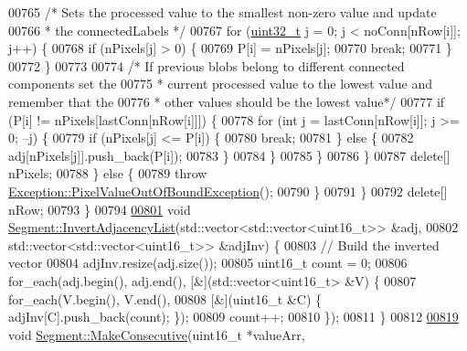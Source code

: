 \begin{DoxyCode}
00765         \textcolor{comment}{/* Sets the processed value to the smallest non-zero value and update}
00766 \textcolor{comment}{         * the connectedLabels */}
00767         \textcolor{keywordflow}{for} (\hyperlink{_soil_math_types_8h_a435d1572bf3f880d55459d9805097f62}{uint32\_t} j = 0; j < noConn[nRow[i]]; j++) \{
00768           \textcolor{keywordflow}{if} (nPixels[j] > 0) \{
00769             P[i] = nPixels[j];
00770             \textcolor{keywordflow}{break};
00771           \}
00772         \}
00773 
00774         \textcolor{comment}{/* If previous blobs belong to different connected components set the}
00775 \textcolor{comment}{         * current processed value to the lowest value and remember that the}
00776 \textcolor{comment}{         * other values should be the lowest value*/}
00777         \textcolor{keywordflow}{if} (P[i] != nPixels[lastConn[nRow[i]]]) \{
00778           \textcolor{keywordflow}{for} (\textcolor{keywordtype}{int} j = lastConn[nRow[i]]; j >= 0; --j) \{
00779             \textcolor{keywordflow}{if} (nPixels[j] <= P[i]) \{
00780               \textcolor{keywordflow}{break};
00781             \} \textcolor{keywordflow}{else} \{
00782               adj[nPixels[j]].push\_back(P[i]);
00783             \}
00784           \}
00785         \}
00786       \}
00787       \textcolor{keyword}{delete}[] nPixels;
00788     \} \textcolor{keywordflow}{else} \{
00789       \textcolor{keywordflow}{throw} \hyperlink{class_vision_1_1_exception_1_1_pixel_value_out_of_bound_exception}{Exception::PixelValueOutOfBoundException}();
00790     \}
00791   \}
00792   \textcolor{keyword}{delete}[] nRow;
00793 \}
00794 
\hypertarget{_segment_8cpp_source_l00801}{}\hyperlink{class_vision_1_1_segment_aac70975917e231c4879ff4f837ac9f73}{00801} \textcolor{keywordtype}{void} \hyperlink{class_vision_1_1_segment_aac70975917e231c4879ff4f837ac9f73}{Segment::InvertAdjacencyList}(std::vector<std::vector<uint16\_t>> &adj,
00802                                   std::vector<std::vector<uint16\_t>> &adjInv) \{
00803   \textcolor{comment}{// Build the inverted vector}
00804   adjInv.resize(adj.size());
00805   uint16\_t count = 0;
00806   for\_each(adj.begin(), adj.end(), [&](std::vector<uint16\_t> &V) \{
00807     for\_each(V.begin(), V.end(),
00808              [&](uint16\_t &C) \{ adjInv[C].push\_back(count); \});
00809     count++;
00810   \});
00811 \}
00812 
\hypertarget{_segment_8cpp_source_l00819}{}\hyperlink{class_vision_1_1_segment_ad1d04c97a79dbbf1cf10e8587985e5e5}{00819} \textcolor{keywordtype}{void} \hyperlink{class_vision_1_1_segment_ad1d04c97a79dbbf1cf10e8587985e5e5}{Segment::MakeConsecutive}(uint16\_t *valueArr, 

\end{DoxyCode}
